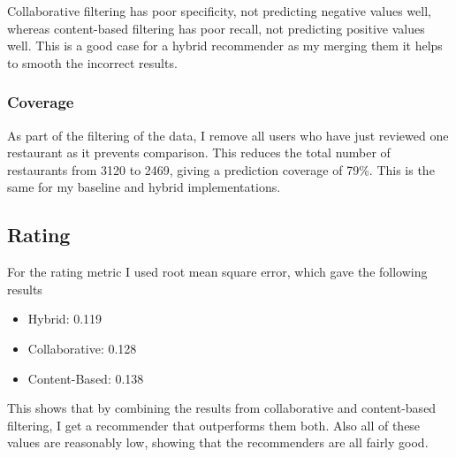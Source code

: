 \documentclass[conference]{IEEEtran}
\begin{document}
\begin{flushleft}
\end{flushleft}


Collaborative filtering has poor specificity, not predicting negative values well, whereas content-based filtering has poor recall, not predicting positive values well. This is a good case for a hybrid recommender as my merging them it helps to smooth the incorrect results.

\subsubsection{Coverage}

As part of the filtering of the data, I remove all users who have just reviewed one restaurant as it prevents comparison. This reduces the total number of restaurants from 3120 to 2469, giving a prediction coverage of 79\%. This is the same for my baseline and hybrid implementations.

\subsection{Rating}

For the rating metric I used root mean square error, which gave the following results
\begin{itemize}
	\item Hybrid: 0.119
	\item Collaborative: 0.128
	\item Content-Based: 0.138
\end{itemize}

This shows that by combining the results from collaborative and content-based filtering, I get a recommender that outperforms them both. Also all of these values are reasonably low, showing that the recommenders are all fairly good.
\end{document}
